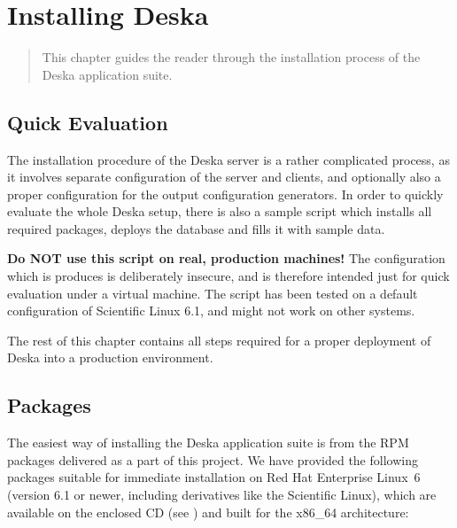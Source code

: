 \documentclass[deska]{subfiles}
\begin{document}
\chapter{Installing Deska}
\label{sec:building}

\begin{abstract}
This chapter guides the reader through the installation process of the Deska application suite.
\end{abstract}

\section{Quick Evaluation}

The installation procedure of the Deska server is a rather complicated process, as it involves separate configuration of
the server and clients, and optionally also a proper configuration for the output configuration generators.  In order to
quickly evaluate the whole Deska setup, there is also a sample script which installs all required packages, deploys the
database and fills it with sample data.

{\bf Do NOT use this script on real, production machines!}  The configuration which is produces is deliberately
insecure, and is therefore intended just for quick evaluation under a virtual machine.  The script has been tested on a
default configuration of Scientific Linux 6.1, and might not work on other systems.


The rest of this chapter contains all steps required for a proper deployment of Deska into a production environment.

\section{Packages}


The easiest way of installing the Deska application suite is from the RPM packages delivered as a part of this project.
We have provided the following packages suitable for immediate installation on Red Hat Enterprise Linux~6 \cite{rhel}
(version 6.1 or newer, including derivatives like the Scientific Linux), which are available on the enclosed CD (see
) and built for the x86\_64 architecture:
\end{document}
